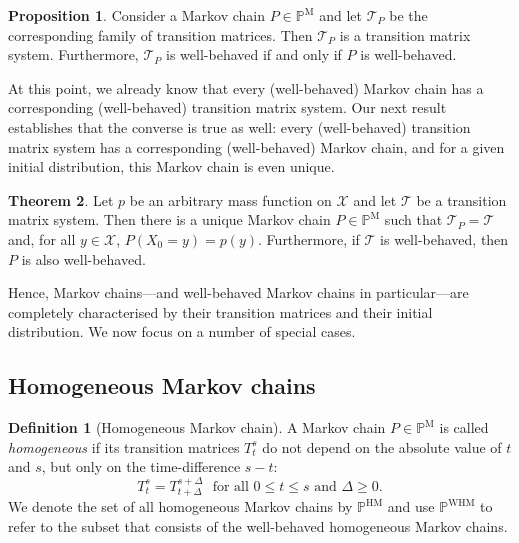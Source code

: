 \documentclass[10pt]{paper}
\theoremstyle{definition}
\newtheorem{theorem}{Theorem}
\newtheorem{proposition}[theorem]{Proposition}
\newtheorem{definition}{Definition}
\newcommand{\states}{\mathcal{X}}
\newcommand{\processes}{\mathbb{P}}
\newcommand{\mprocesses}{\processes^{\mathrm{M}}}
\newcommand{\hmprocesses}{\processes^{\mathrm{HM}}}
\newcommand{\whmprocesses}{\processes^{\mathrm{WHM}}}
\begin{document}
\begin{proposition}\label{prop:Markovhassystem}
Consider a Markov chain $P\in\mprocesses$ and let $\mathcal{T}_P$ be the corresponding family of transition matrices. Then $\mathcal{T}_P$ is a transition matrix system. Furthermore, $\mathcal{T}_P$ is well-behaved if and only if $P$ is well-behaved.
\end{proposition}

At this point, we already know that every (well-behaved) Markov chain has a corresponding (well-behaved) transition matrix system. Our next result establishes that the converse is true as well: every (well-behaved) transition matrix system has a corresponding (well-behaved) Markov chain, and for a given initial distribution, this Markov chain is even unique.

\begin{theorem}\label{theo:uniqueMarkovchain}
 Let $p$ be an arbitrary mass function on $\states$ and let $\mathcal{T}$ be a transition matrix system. Then there is a unique Markov chain $P\in\mprocesses$ such that $\mathcal{T}_P=\mathcal{T}$ and, for all $y\in\states$, $P(X_0=y)=p(y)$. Furthermore, if $\mathcal{T}$ is well-behaved, then $P$ is also well-behaved.
\end{theorem}

Hence, Markov chains---and well-behaved Markov chains in particular---are completely characterised by their transition matrices and their initial distribution. 
We now focus on a number of special cases.

\subsection{Homogeneous Markov chains}\label{sec:homogen_markov_chain}

\begin{definition}[Homogeneous Markov chain]\label{def:homogeneousMarkov}
A Markov chain $P\in\mprocesses$ is called \emph{homogeneous} if its transition matrices $T_t^s$ do not depend on the absolute value of $t$ and $s$, but only on the time-difference $s-t$:
\begin{equation}\label{eq:homogeneousMarkov}
T_t^s=T_{t+\Delta}^{s+\Delta}
\text{~~for all $0\leq t\leq s$ and $\Delta\geq0$.}
\end{equation}
We denote the set of all homogeneous Markov chains by $\hmprocesses$ and use $\whmprocesses$ to refer to the subset that consists of the well-behaved homogeneous Markov chains.
\end{definition}
\end{document}
